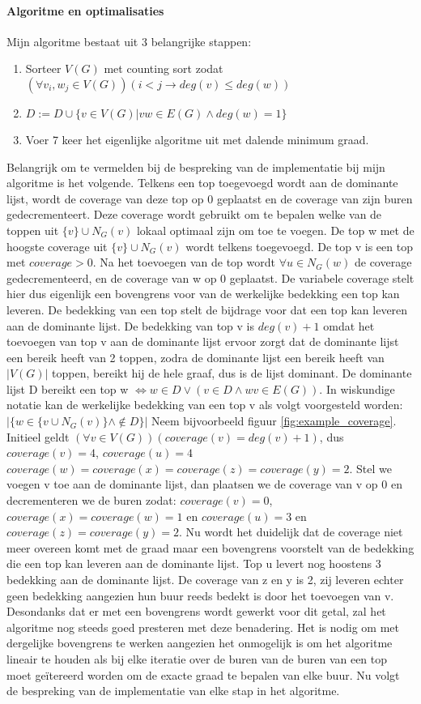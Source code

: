 \documentclass[11pt, a4paper, table]{article}
\theoremstyle{definition}
\theoremstyle{definition}
\theoremstyle{definition}
\begin{document}
\paragraph{Algoritme en optimalisaties}
Mijn algoritme bestaat uit 3 belangrijke stappen: 
\begin{enumerate}
	\item \label{itm:sort} Sorteer $V(G)$ met counting sort zodat $(\forall v_i,w_j \in V(G))(i<j \rightarrow deg(v) \leq deg(w))$
	\item \label{itm:degree1}$D := D \cup \{v \in V(G) | vw \in E(G) \land deg(w)=1\}$
	\item \label{itm:actualalg} Voer 7 keer het eigenlijke algoritme uit met dalende minimum graad. 
\end{enumerate}
Belangrijk om te vermelden bij de bespreking van de implementatie bij mijn algoritme is het volgende. Telkens een top toegevoegd wordt aan de dominante lijst, wordt de coverage van deze top op 0 geplaatst en de coverage van zijn buren gedecrementeert. Deze coverage wordt gebruikt om te bepalen welke van de toppen uit $\{v\} \cup N_G(v)$ lokaal optimaal zijn om toe te voegen. De top w met de hoogste coverage uit $\{v\} \cup N_G(v)$ wordt telkens toegevoegd. De top v is een top met $coverage > 0$. Na het toevoegen van de top wordt $\forall u \in N_G(w)$ de coverage gedecrementeerd, en de coverage van w op 0 geplaatst. De variabele coverage stelt hier dus eigenlijk een bovengrens voor van de werkelijke bedekking een top kan leveren. De bedekking van een top stelt de bijdrage voor dat een top kan leveren aan de dominante lijst. De bedekking van top v is $deg(v)+1$ omdat het toevoegen van top v aan de dominante lijst ervoor zorgt dat de dominante lijst een bereik heeft van 2 toppen, zodra de dominante lijst een bereik heeft van $|V(G)|$ toppen, bereikt hij de hele graaf, dus is de lijst dominant. De dominante lijst D bereikt een top w $\iff w \in D \lor (v \in D \land wv \in E(G))$.  In wiskundige notatie kan de werkelijke bedekking van een top v als volgt voorgesteld worden:  $|\{w \in \{v \cup N_G(v)\} \land \not\in D\}|$
Neem bijvoorbeeld figuur \ref{fig:example_coverage}. Initieel geldt $(\forall v \in V(G))( coverage(v)=deg(v)+1)$, dus $coverage(v)=4$, $coverage(u)=4$ $coverage(w)=coverage(x)=coverage(z)=coverage(y)=2$.
Stel we voegen v toe aan de dominante lijst, dan plaatsen we de coverage van v op 0 en decrementeren we de buren zodat: $coverage(v)=0$,  $coverage(x)=coverage(w)=1$ 
en $coverage(u)=3$ en $coverage(z)=coverage(y)=2$. Nu wordt het duidelijk dat de coverage niet meer overeen komt met de graad maar een bovengrens voorstelt van de bedekking die een top kan leveren aan de dominante lijst. Top u levert nog hoostens 3 bedekking aan de dominante lijst. De coverage van z en y is 2, zij leveren echter geen bedekking aangezien hun buur reeds bedekt is door het toevoegen van v. Desondanks dat er met een bovengrens wordt gewerkt voor dit getal, zal het algoritme nog steeds goed presteren met deze benadering. Het is nodig om met dergelijke bovengrens te werken aangezien het onmogelijk is om het algoritme lineair te houden als bij elke iteratie over de buren van de buren van een top moet ge\"{i}tereerd worden om de exacte graad te bepalen van elke buur. Nu volgt de bespreking van de implementatie van elke stap in het algoritme.
\end{document}
